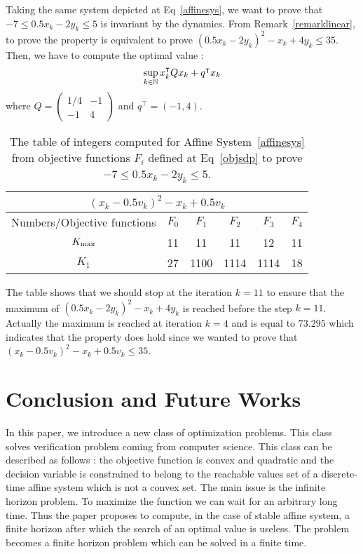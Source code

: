 \documentclass[10pt]{llncs}
\begin{document}
Taking the same system depicted at Eq~\eqref{affinesys}, we want to prove that $-7\leq 0.5x_k-2y_k\leq 5$ is invariant by the dynamics. From Remark~\ref{remarklinear}, to prove the property is equivalent to prove $(0.5x_k-2 y_k)^2-x_k+4y_k\leq 35$. Then, we have to compute the optimal value :
\[
\sup_{k\in\mathbb{N}} x_k^\intercal Q x_k+q^\intercal x_k  
\]
where $Q=\begin{pmatrix} 1/4 & -1 \\ -1 & 4\end{pmatrix}$ and $q^\intercal=(-1,4)$.  
\begin{table}[h!]
\begin{center}
\begin{tabular}{|c|c|c|c|c|c|}
\hline
\multicolumn{6}{|c|}{$(x_k-0.5 v_k)^2-x_k+0.5 v_k$}\\
\hline
Numbers/Objective functions & $F_0$ & $F_{1}$ & $F_{2}$ & $F_3$ & $F_4$ \\
\hline
$K_{\rm max}$ & 11&11 &11 &12 &11 \\
\hline
 $K_{1}$ & 27 &1100 &1114 &1114 &18 \\
\hline
\end{tabular}
\end{center}
\caption{The table of integers computed for Affine System~\eqref{affinesys} from objective functions $F_i$ defined at Eq~\eqref{objsdp} to prove $-7\leq 0.5x_k-2y_k\leq 5$.}
\end{table}

The table shows that we should stop at the iteration $k=11$ to ensure that the maximum of $(0.5x_k-2 y_k)^2-x_k+4y_k$ is reached before the step $k=11$. Actually the maximum is reached at iteration $k=4$ and is equal to $73.295$ which indicates that the property does hold since we wanted to prove that
$(x_k-0.5 v_k)^2-x_k+0.5 v_k\leq 35$.

\section{Conclusion and Future Works}
\label{conclusion}
In this paper, we introduce a new class of optimization problems. This class solves verification problem coming from computer science. This class can be described as follows : the objective function is convex and quadratic and the decision variable is constrained to belong to the reachable values set of a discrete-time affine system which is not a convex set. The main issue is the infinite horizon problem. To maximize the function we can wait for an arbitrary long time. Thus the paper proposes to compute, in the case of stable affine system, a finite horizon after which the search of an optimal value is useless. The problem becomes a finite horizon problem which can be solved in a finite time. 
\end{document}
